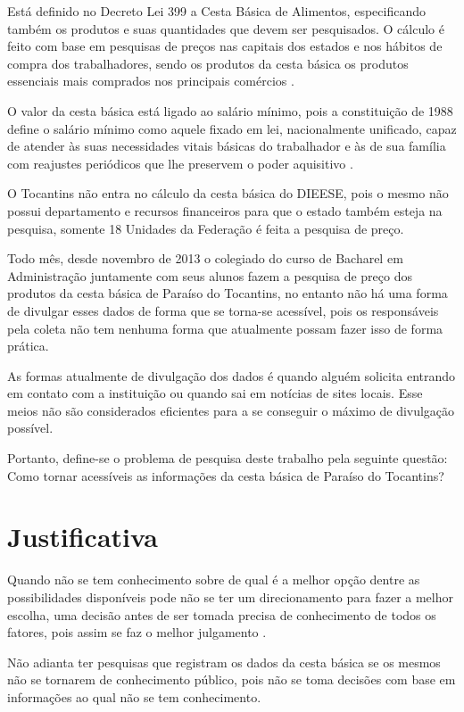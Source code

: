 \documentclass{ifto-tex}
\begin{document}
		Está definido no Decreto Lei 399 a Cesta Básica de Alimentos, especificando também os produtos e suas quantidades que devem ser pesquisados. O cálculo é feito com base em pesquisas de preços nas capitais dos estados e nos hábitos de compra dos trabalhadores, sendo os produtos da cesta básica os produtos essenciais mais comprados nos principais comércios \cite{metodolo8:online}.
		
		O valor da cesta básica está ligado ao salário mínimo, pois a constituição de 1988 define o salário mínimo como aquele fixado em lei, nacionalmente unificado, capaz de atender às suas necessidades vitais básicas do trabalhador e às de sua família com reajustes periódicos que lhe preservem o poder aquisitivo \cite{metodolo8:online}.
		
		O Tocantins não entra no cálculo da cesta básica do DIEESE, pois o mesmo não possui departamento e recursos financeiros para que o estado também esteja na pesquisa, somente 18 Unidades da Federação é feita a pesquisa de preço.
		
		Todo mês, desde novembro de 2013 o colegiado do curso de Bacharel em Administração juntamente com seus alunos fazem a pesquisa de preço dos produtos da cesta básica de Paraíso do Tocantins, no entanto não há uma forma de divulgar esses dados de forma que se torna-se acessível, pois os responsáveis pela coleta não tem nenhuma forma que atualmente possam fazer isso de forma prática.
		
		As formas atualmente de divulgação dos dados é quando alguém solicita entrando em contato com a instituição ou quando sai em notícias de sites locais. Esse meios não são considerados eficientes para a se conseguir o máximo de divulgação possível.
		
		Portanto, define-se o problema de pesquisa deste trabalho pela seguinte questão: Como tornar acessíveis as informações da cesta básica de Paraíso do Tocantins?
		
	
\chapter{Justificativa}
	
		Quando não se tem conhecimento sobre de qual é a melhor opção dentre as possibilidades disponíveis pode não se ter um direcionamento para fazer a melhor escolha, uma decisão antes de ser tomada precisa de conhecimento de todos os fatores, pois assim se faz o melhor julgamento \cite{bezerra2013efeito}.
		
		Não adianta ter pesquisas que registram os dados da cesta básica se os mesmos não se tornarem de conhecimento público, pois não se toma decisões com base em informações ao qual não se tem conhecimento.
		
\end{document}
